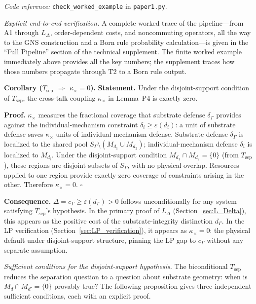 \documentclass[11pt]{article}
\theoremstyle{remark}
\newcommand{\coderef}[2]{\smallskip\noindent\textit{Code reference:} \texttt{#1} in \texttt{#2}.}
\begin{document}
\coderef{check\_worked\_example}{paper1.py}


\smallskip\noindent\textit{Explicit end-to-end verification.}  A complete worked trace of the pipeline---from A1 through $L_\Delta$, order-dependent costs, and noncommuting operators, all the way to the GNS construction and a Born rule probability calculation---is given in the ``Full Pipeline'' section of the technical supplement.  The finite worked example immediately above provides all the key numbers; the supplement traces how those numbers propagate through T2 to a Born rule output.


\label{sec:overlap_detail}

\medskip\noindent\textbf{Corollary ($T_{\mathrm{sep}}$ $\Rightarrow$ $\kappa_\times = 0$).}
\textbf{Statement.}  Under the disjoint-support condition of $T_{\mathrm{sep}}$, the cross-talk coupling $\kappa_\times$ in Lemma~P4 is exactly zero.

\smallskip\noindent\textbf{Proof.}
$\kappa_\times$ measures the fractional coverage that substrate defense $\delta_\Gamma$ provides against the individual-mechanism constraint $\delta_i \ge \varepsilon(d_i)$: a unit of substrate defense saves $\kappa_\times$ units of individual-mechanism defense.  Substrate defense $\delta_\Gamma$ is localized to the shared pool $S_\Gamma \setminus (M_{d_1} \cup M_{d_2})$; individual-mechanism defense $\delta_i$ is localized to $M_{d_i}$.  Under the disjoint-support condition $M_{d_1} \cap M_{d_2} = \{0\}$ (from $T_{\mathrm{sep}}$), these regions are disjoint subsets of $S_\Gamma$, with no physical overlap.  Resources applied to one region provide exactly zero coverage of constraints arising in the other.  Therefore $\kappa_\times = 0$.  \hfill$\square$

\smallskip\noindent\textbf{Consequence.}  $\Delta = c_\Gamma \ge \varepsilon(d_\Gamma) > 0$ follows unconditionally for any system satisfying $T_{\mathrm{sep}}$'s hypothesis.  In the primary proof of $L_\Delta$ (Section~\ref{sec:L_Delta}), this appears as the positive cost of the substrate-integrity distinction $d_\Gamma$.  In the LP verification (Section~\ref{sec:LP_verification}), it appears as $\kappa_\times = 0$: the physical default under disjoint-support structure, pinning the LP gap to $c_\Gamma$ without any separate assumption.


\smallskip\noindent\textit{Sufficient conditions for the disjoint-support hypothesis.}  The biconditional $T_{\mathrm{sep}}$ reduces the separation question to a question about substrate geometry: when is $M_d \cap M_{d'} = \{0\}$ provably true?  The following proposition gives three independent sufficient conditions, each with an explicit proof.
\end{document}

